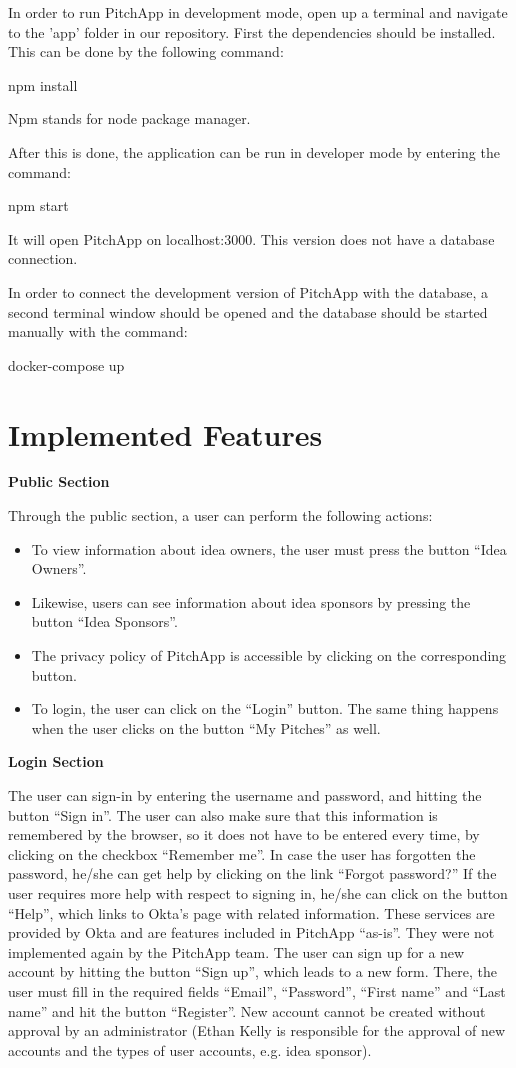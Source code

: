 In order to run PitchApp in development mode, open up a terminal and navigate to the 'app' folder in our repository. First the dependencies should be installed. This can be done by the following command:

npm install

Npm stands for node package manager.

After this is done, the application can be run in developer mode by entering the command:

npm start

It will open PitchApp on localhost:3000. This version does not have a database connection.

In order to connect the development version of PitchApp with the database, a second terminal window should be opened and the database should be started manually with the command:

docker-compose up

\section{Implemented Features}

\textbf{Public Section}

Through the public section, a user can perform the following actions:

\begin{itemize}

\item To view information about idea owners, the user must press the button “Idea Owners”.
\item Likewise, users can see information about idea sponsors by pressing the button “Idea Sponsors”.
\item The privacy policy of PitchApp is accessible by clicking on the corresponding button.
\item To login, the user can click on the “Login” button. The same thing happens when the user clicks on the button “My Pitches” as well.

\end{itemize}

\textbf{Login Section}

The user can sign-in by entering the username and password, and hitting the button “Sign in”.
The user can also make sure that this information is remembered by the browser, so it does not have to be entered every time, by clicking on the checkbox “Remember me”.
In case the user has forgotten the password, he/she can get help by clicking on the link “Forgot password?”
If the user requires more help with respect to signing in, he/she can click on the button “Help”, which links to Okta’s page with related information.
These services are provided by Okta and are features included in PitchApp “as-is”. They were not implemented again by the PitchApp team.
The user can sign up for a new account by hitting the button “Sign up”, which leads to a new form. There, the user must fill in the required fields “Email”, “Password”, “First name” and “Last name” and hit the button “Register”.
New account cannot be created without approval by an administrator (Ethan Kelly is responsible for the approval of new accounts and the types of user accounts, e.g. idea sponsor).


